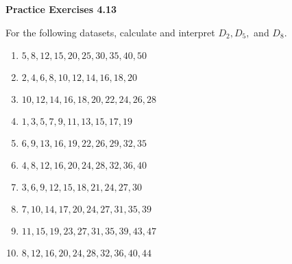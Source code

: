 \vspace{0.3ex}
\noindent\textbf{Practice Exercises 4.13}

\vspace{0.2ex}

For the following datasets, calculate and interpret \(D_2, D_5,\) and \(D_8\). 

\begin{enumerate}
    \item \(5, 8, 12, 15, 20, 25, 30, 35, 40, 50\)  
    \item \(2, 4, 6, 8, 10, 12, 14, 16, 18, 20\)  
    \item \(10, 12, 14, 16, 18, 20, 22, 24, 26, 28\)  
    \item \(1, 3, 5, 7, 9, 11, 13, 15, 17, 19\)  
    \item \(6, 9, 13, 16, 19, 22, 26, 29, 32, 35\)  
    \item \(4, 8, 12, 16, 20, 24, 28, 32, 36, 40\)  
    \item \(3, 6, 9, 12, 15, 18, 21, 24, 27, 30\)  
    \item \(7, 10, 14, 17, 20, 24, 27, 31, 35, 39\)  
    \item \(11, 15, 19, 23, 27, 31, 35, 39, 43, 47\)  
    \item \(8, 12, 16, 20, 24, 28, 32, 36, 40, 44\)  
\end{enumerate}
